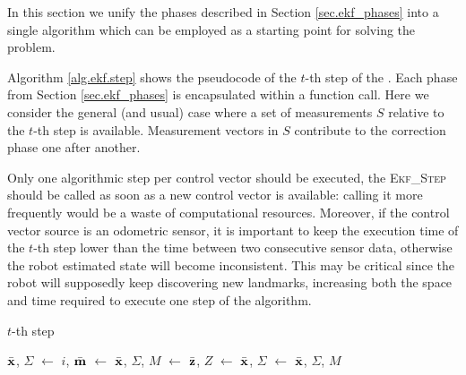 In this section we unify the phases described in Section \ref{sec.ekf_phases} into a single algorithm which can be employed as a starting point for solving the \SLAM{} problem.

Algorithm \ref{alg.ekf.step} shows the pseudocode of the $t$-th step of the \Ekf{}.
Each phase from Section \ref{sec.ekf_phases} is encapsulated within a function call.
Here we consider the general (and usual) case where a set of measurements $S$ relative to the $t$-th step is available.
Measurement vectors in $S$ contribute to the correction phase one after another.

Only one algorithmic step per control vector should be executed, \ie{} the \textsc{Ekf\_Step} should be called as soon as a new control vector is available: calling it more frequently would be a waste of computational resources.
Moreover, if the control vector source is an odometric sensor, it is important to keep the execution time of the $t$-th step lower than the time between two consecutive sensor data, otherwise the robot estimated state will become inconsistent.
This may be critical since the robot will supposedly keep discovering new landmarks, increasing both the space and time required to execute one step of the algorithm.

\begin{algorithm}
	\caption{\Ekf{} $t$-th step}
	\label{alg.ekf.step}
	\begin{algorithmic}[1]
		
			\State $\bar{\boldsymbol{\mathrm{{x}}}}$, $\Sigma$ $\gets$ 
				\State $i$, $\bar{\boldsymbol{\mathrm{{m}}}}$ $\gets$ 
					\State $\bar{\boldsymbol{\mathrm{{x}}}}$, $\Sigma$, $M$ $\gets$ 
				\EndIf
				\State $\bar{\boldsymbol{\mathrm{{z}}}}$, $Z$ $\gets$ 
				\State $\bar{\boldsymbol{\mathrm{{x}}}}$, $\Sigma$ $\gets$ 
			\EndFor
			\State \Return $\bar{\boldsymbol{\mathrm{{x}}}}$, $\Sigma$, $M$
		\EndFunction
	\end{algorithmic}
\end{algorithm}